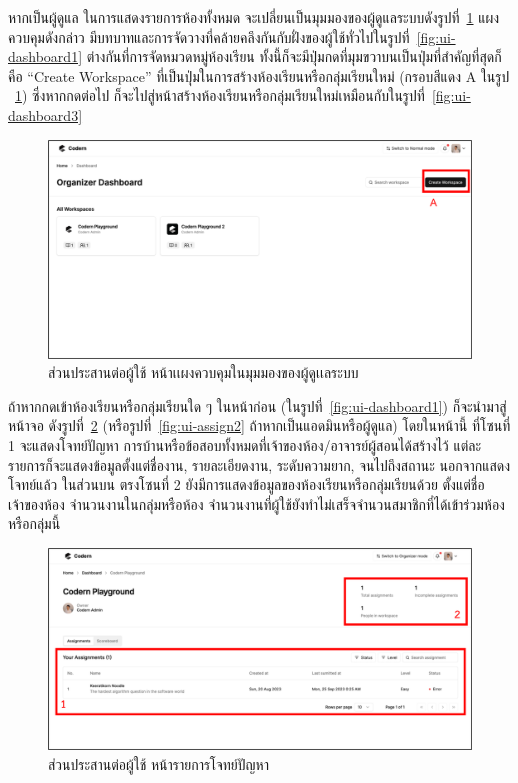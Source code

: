 \documentclass[12pt,one side,openright,a4paper]{cpe-thesis-th}
\newcommand{\thaijustify}[1]{%
  \par\hspace{30pt}\justifying
  #1
}
\begin{document}
\thaijustify{
  หากเป็นผู้ดูแล ในการแสดงรายการห้องทั้งหมด จะเปลี่ยนเป็นมุมมองของผู้ดูแลระบบดังรูปที่~\ref{fig:ui-org-dashboard1} แผงควบคุมดังกล่าว มีบทบาทและการจัดวางที่คล้ายคลึงกันกับฝั่งของผู้ใช้ทั่วไปในรูปที่~\ref{fig:ui-dashboard1} ต่างกันที่การจัดหมวดหมู่ห้องเรียน ทั้งนี้ก็จะมีปุ่มกดที่มุมขวาบนเป็นปุ่มที่สำคัญที่สุดก็คือ “Create Workspace” ที่เป็นปุ่มในการสร้างห้องเรียนหรือกลุ่มเรียนใหม่ (กรอบสีแดง A ในรูป ~\ref{fig:ui-org-dashboard1}) ซึ่งหากกดต่อไป ก็จะไปสู่หน้าสร้างห้องเรียนหรือกลุ่มเรียนใหม่เหมือนกับในรูปที่~\ref{fig:ui-dashboard3}
}
\hypertarget{ui-org-dashboard1}{
  \begin{figure}[H]
    \centering
    \includegraphics[width=15cm]{figure/ui/ui-org-dashboard1.png}
    \caption[ส่วนประสานต่อผู้ใช้ หน้าแผงควบคุม ในมุมมองของผู้ดูแลระบบ]{ส่วนประสานต่อผู้ใช้ หน้าเเผงควบคุมในมุมมองของผู้ดูเเลระบบ}
    \label{fig:ui-org-dashboard1}
  \end{figure}
}
\thaijustify{
  ถ้าหากกดเข้าห้องเรียนหรือกลุ่มเรียนใด ๆ ในหน้าก่อน (ในรูปที่~\ref{fig:ui-dashboard1}) ก็จะนำมาสู่หน้าจอ ดังรูปที่~\ref{fig:ui-assign1} (หรือรูปที่~\ref{fig:ui-assign2} ถ้าหากเป็นแอดมินหรือผู้ดูแล) โดยในหน้านี้ ที่โซนที่ 1 จะแสดงโจทย์ปัญหา การบ้านหรือข้อสอบทั้งหมดที่เจ้าของห้อง/อาจารย์ผู้สอนได้สร้างไว้ แต่ละรายการก็จะแสดงข้อมูลตั้งแต่ชื่องาน, รายละเอียดงาน, ระดับความยาก, จนไปถึงสถานะ นอกจากแสดงโจทย์แล้ว ในส่วนบน ตรงโซนที่ 2 ยังมีการแสดงข้อมูลของห้องเรียนหรือกลุ่มเรียนด้วย ตั้งแต่ชื่อเจ้าของห้อง จำนวนงานในกลุ่มหรือห้อง จำนวนงานที่ผู้ใช้ยังทำไม่เสร็จจำนวนสมาชิกที่ได้เข้าร่วมห้องหรือกลุ่มนี้
}
\hypertarget{ui-assign1}{
  \begin{figure}[H]
    \centering
    \includegraphics[width=15cm]{figure/ui/ui-assign1.png}
    \caption[ส่วนประสานต่อผู้ใช้ หน้ารายการโจทย์ปัญหา]{ส่วนประสานต่อผู้ใช้ หน้ารายการโจทย์ปัญหา}
    \label{fig:ui-assign1}
  \end{figure}
}
\end{document}
